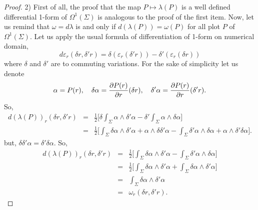 \documentclass[10pt,reqno,twoside]{amsart}
\def \epsilon{\varepsilon}
\newcommand{\undemi}{\frac{1}{2}}
\theoremstyle{plain}
\theoremstyle{definition}
\begin{document}
\begin{proof}
    2) First of all,
    the proof that the map $P \mapsto \lambda(P)$ is a well defined differential 1-form of $\Omega^1(\Sigma)$ is analogous to the proof of the first item.
    Now,
    let us remind that $\omega = d\lambda$ is and only if $d(\lambda(P)) = \omega(P)$ for all plot $P$ of $\Omega^1(\Sigma)$.
    Let us apply the usual formula of differentiation of 1-form on numerical domain,
    $$d\epsilon_r(\delta r,\delta' r) = \delta(\epsilon_r(\delta' r)) - \delta'(\epsilon_r(\delta r))$$
    where $\delta$ and $\delta'$ are to commuting variations.
    For the sake of simplicity let us denote
    $$
      \alpha = P (r), \quad \delta\alpha = {\partial P (r) \over \partial r}(\delta r), \quad \delta'\alpha = {\partial P (r) \over \partial r}(\delta' r).
      $$
    So,
    \begin{eqnarray*}
      d(\lambda(P))_r(\delta r,\delta' r) & = & \undemi \bigg[\delta \int_\Sigma \alpha \wedge \delta' \alpha - \delta' \int_\Sigma \alpha \wedge \delta \alpha \bigg] \\
      & = & \undemi \bigg[\int_\Sigma \delta \alpha \wedge \delta' \alpha + \alpha \wedge \delta \delta' \alpha - \int_\Sigma \delta' \alpha \wedge \delta \alpha + \alpha \wedge \delta' \delta \alpha \bigg].
    \end{eqnarray*}
    but,
    $\delta \delta' \alpha = \delta' \delta \alpha$.
    So,
    \begin{eqnarray*}
      d(\lambda(P))_r(\delta r,\delta' r) & = & \undemi \bigg[\int_\Sigma \delta \alpha \wedge \delta' \alpha - \int_\Sigma \delta' \alpha \wedge \delta\alpha \bigg] \\
      & = & \undemi \bigg[\int_\Sigma \delta \alpha \wedge \delta' \alpha + \int_\Sigma \delta \alpha \wedge \delta' \alpha \bigg] \\
      & = & \int_\Sigma \delta \alpha \wedge \delta' \alpha \\
      & = & \omega_r(\delta r,\delta' r).
    \end{eqnarray*}
    

\end{proof}
\end{document}

